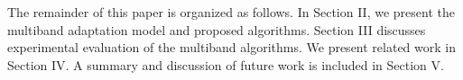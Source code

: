 
The remainder of this paper is organized as follows. In Section II, we present the multiband adaptation model and proposed algorithms. Section III discusses experimental evaluation of the multiband algorithms. We present related work in Section IV. A summary and discussion of future work is included in Section V.

